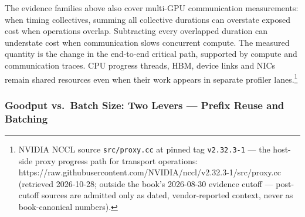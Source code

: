 The evidence families above also cover multi-GPU communication
measurements: when timing collectives, summing all collective durations
can overstate exposed cost when operations overlap. Subtracting every
overlapped duration can understate cost when communication slows
concurrent compute. The measured quantity is the change in the
end-to-end critical path, supported by compute and communication traces.
CPU progress threads, HBM, device links and NICs remain shared resources
even when their work appears in separate profiler lanes.\footnote{NVIDIA
  NCCL source \texttt{src/proxy.cc} at pinned tag \texttt{v2.32.3-1} ---
  the host-side proxy progress path for transport operations:
  https://raw.githubusercontent.com/NVIDIA/nccl/v2.32.3-1/src/proxy.cc
  (retrieved 2026-10-28; outside the book's 2026-08-30 evidence cutoff
  --- post-cutoff sources are admitted only as dated, vendor-reported
  context, never as book-canonical numbers).}

\subsubsection{Goodput vs.~Batch Size: Two Levers --- Prefix Reuse and
Batching}\label{goodput-vs.-batch-size-two-levers-prefix-reuse-and-batching}

